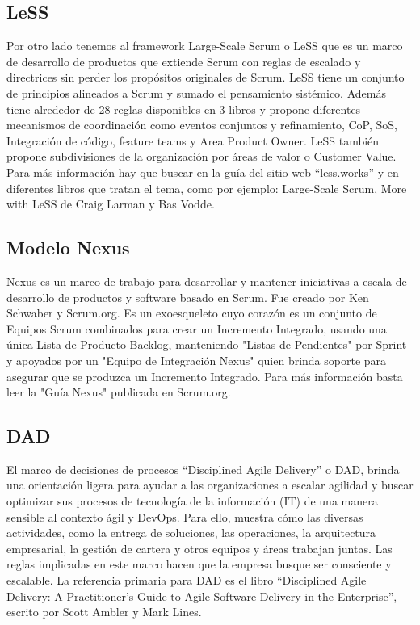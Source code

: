 \subsection{LeSS}

Por otro lado tenemos al framework Large-Scale Scrum o LeSS que  es un marco de desarrollo de productos que extiende Scrum con reglas de escalado y directrices sin perder los propósitos originales de Scrum. LeSS tiene un conjunto de principios alineados a Scrum y sumado el pensamiento sistémico. Además tiene alrededor de 28 reglas disponibles en 3 libros y propone diferentes mecanismos de coordinación como eventos conjuntos y refinamiento, CoP, SoS, Integración de código, feature teams y Area Product Owner. LeSS también propone subdivisiones de la organización por áreas de valor o Customer Value. Para más información hay que buscar en la guía del sitio web “less.works” y en diferentes libros que tratan el tema, como por ejemplo: Large-Scale Scrum, More with LeSS de Craig Larman y Bas Vodde.

\subsection{Modelo Nexus}

Nexus es un marco de trabajo para desarrollar y mantener iniciativas a escala de desarrollo de productos y software basado en Scrum. Fue creado por Ken Schwaber y Scrum.org. Es un exoesqueleto cuyo corazón es un conjunto de Equipos Scrum combinados para crear un Incremento Integrado, usando una única Lista de Producto Backlog, manteniendo "Listas de Pendientes" por Sprint y apoyados por un "Equipo de Integración Nexus" quien brinda soporte para asegurar que se produzca un Incremento Integrado. Para más información basta leer la "Guía Nexus" publicada en Scrum.org.

\subsection{DAD}

El marco de decisiones de procesos “Disciplined Agile Delivery” o DAD, brinda una orientación ligera para ayudar a las organizaciones a escalar agilidad y buscar optimizar sus procesos de tecnología de la información (IT) de una manera sensible al contexto ágil y DevOps. Para ello, muestra cómo las diversas actividades, como la entrega de soluciones, las operaciones, la arquitectura empresarial, la gestión de cartera y otros equipos y áreas trabajan juntas. Las reglas implicadas en este marco hacen que la empresa busque ser consciente y escalable. La referencia primaria para DAD es el libro “Disciplined Agile Delivery: A Practitioner's Guide to Agile Software Delivery in the Enterprise”,  escrito por Scott Ambler y Mark Lines.\newline
\newline

